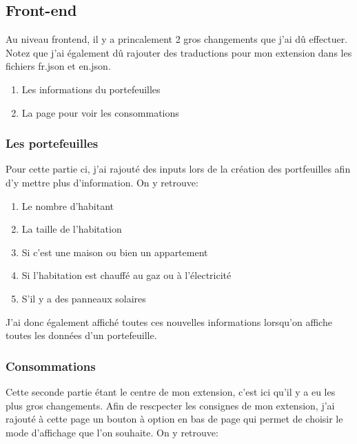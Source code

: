 \subsection{Front-end}

\begin{flushleft}
Au niveau frontend, il y a princalement 2 gros changements que j'ai dû effectuer.
Notez que j'ai également dû rajouter des traductions pour mon extension dans les fichiers fr.json et en.json.
\end{flushleft}

\begin{enumerate}
    \item Les informations du portefeuilles
    \item La page pour voir les consommations
\end{enumerate}

\subsubsection{Les portefeuilles}
\begin{flushleft}
Pour cette partie ci, j'ai rajouté des inputs lors de la création des portfeuilles afin d'y mettre plus d'information. On y retrouve:
\end{flushleft}

\begin{enumerate}
    \item Le nombre d'habitant
    \item La taille de l'habitation
    \item Si c'est une maison ou bien un appartement
    \item Si l'habitation est chauffé au gaz ou à l'électricité
    \item S'il y a des panneaux solaires
\end{enumerate}

\begin{flushleft}
J'ai donc également affiché toutes ces nouvelles informations lorsqu'on affiche toutes les données d'un portefeuille.
\end{flushleft}

\subsubsection{Consommations}
\begin{flushleft}
Cette seconde partie étant le centre de mon extension, c'est ici qu'il y a eu les plus gros changements. Afin de rescpecter les consignes de mon extension, j'ai rajouté à cette page un bouton à option en bas de page qui permet de choisir le mode d'affichage que l'on souhaite. On y retrouve:
\end{flushleft}


